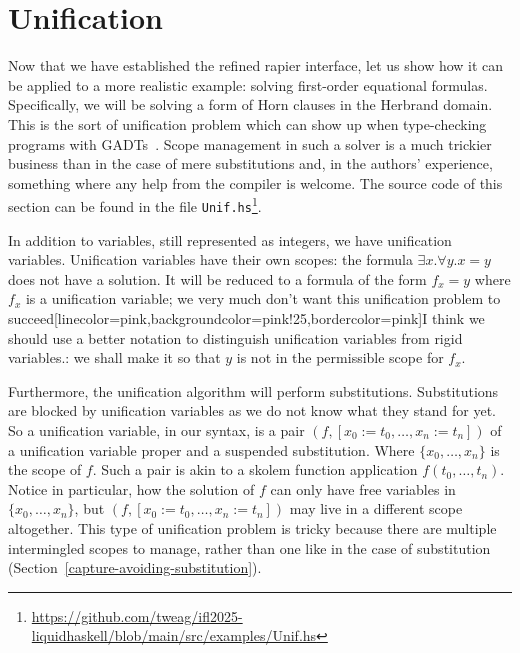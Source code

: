 \documentclass[sigconf, review]{acmart}
\newcommand{\improvement}[1]{\todo[linecolor=pink,backgroundcolor=pink!25,bordercolor=pink]{#1}}
\renewcommand{\todo}{}
\newcommand{\improvement}[1]{{}}
\newcommand{\tc}[1]{{\small\texttt{#1}}}
\newcommand{\sourcefile}[1]{\tc{#1}\footnote{\scriptsize\url{https://github.com/tweag/ifl2025-liquidhaskell/blob/main/src/examples/#1}}}
\begin{document}




\section{Unification}
\label{unification}

Now that we have established the refined rapier interface, let us show how it
can be applied to a more realistic example: solving first-order equational
formulas. Specifically, we will be solving a form of Horn clauses in
the Herbrand domain. This is the sort of unification problem which can show up
when type-checking programs with GADTs~\cite{schrijvers09}. Scope management in
such a solver is a much trickier business than in the case of mere substitutions
and, in the authors' experience, something where any help from the compiler is welcome.
The source code of this section can be found in the file
\sourcefile{Unif.hs}.

In addition to variables, still represented as integers, we have unification
variables. Unification variables have their own scopes: the formula
$\exists x. \forall y. x=y$ does not have a solution. It will be reduced to a
formula of the form $f_{x} = y$ where $f_{x}$ is a unification variable; we very much
don't want this unification problem to succeed\improvement{I think we should
  use a better notation to distinguish unification variables from rigid
  variables.}: we shall make it so that $y$ is not in the permissible scope for $f_{x}$.

Furthermore, the unification algorithm will perform substitutions. Substitutions are blocked by
unification variables as we do not know what they stand for yet. So a unification
variable, in our syntax, is a pair $(f, [x_0:=t_0,\ldots,x_n:=t_n])$ of a
unification variable proper and a suspended substitution. Where
$\{x_0,\ldots,x_{n}\}$ is the scope of $f$. Such a pair is akin to a skolem
function application $f(t_0,\ldots,t_n)$. Notice in particular, how the solution
of $f$ can only have free variables in $\{x_0,\ldots,x_{n}\}$, but
$(f, [x_0:=t_0,\ldots,x_n:=t_n])$ may live in a different scope altogether.
This type of unification problem is tricky because there are multiple
intermingled scopes to manage, rather than one like
in the case of substitution (Section~\ref{capture-avoiding-substitution}).
\end{document}
